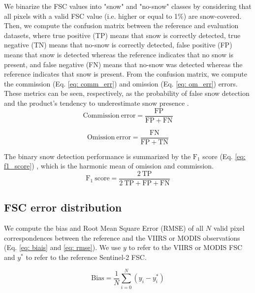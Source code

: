 \documentclass[tc, manuscript]{copernicus}
\begin{document}
We binarize the FSC values into "snow" and "no-snow" classes by considering that all pixels with a valid FSC value (i.e. higher or equal to 1\%) are snow-covered. Then, we compute the confusion matrix between the reference and evaluation datasets, where true positive (TP) means that snow is correctly detected, true negative (TN) means that no-snow is correctly detected, false positive (FP) means that snow is detected whereas the reference indicates that no snow is present, and false negative (FN) means that no-snow was detected whereas the reference indicates that snow is present. From the confusion matrix, we compute the commission (Eq. \ref{eq: comm_err}) and omission (Eq. \ref{eq: om_err}) errors. These metrics can be seen, respectively, as the probability of false snow detection and the product's tendency to underestimate snow presence \citep{schwaizer2020SnowCoverExtentb}.
\begin{equation}
    \mathrm{Commission ~ error} = \frac{\mathrm{FP}}{\mathrm{FP}+\mathrm{FN}}
\label{eq: comm_err}
\end{equation}


\begin{equation}
    \mathrm{Omission ~ error} = \frac{\mathrm{FN}}{\mathrm{FP}+\mathrm{TN}}
\label{eq: om_err}
\end{equation}

The binary snow detection performance is summarized by the $\mathrm{F_1}$ score (Eq. \ref{eq: f1_score}) \citep{rittger_evaluation_2021, zhang_comparative_2020}, which is the harmonic mean of omission and commission.
\begin{equation}
    \mathrm{F_1 ~ score} = \frac{2~\mathrm{TP}}{2~\mathrm{TP}+\mathrm{FP}+\mathrm{FN}}
\label{eq: f1_score}
\end{equation}





\subsection{FSC error distribution}
\label{subsec: methods_distribution}

We compute the bias and Root Mean Square Error (RMSE) of all $ N $ valid pixel correspondences between the reference and the VIIRS or MODIS observations (Eq. \ref{eq: biais} and \ref{eq: rmse}). We use $y$ to refer to the VIIRS or MODIS FSC and $y^*$ to refer to the reference Sentinel-2 FSC.


\begin{equation}
 \mathrm{Bias} = \frac{1}{N} \sum_{i=0}^{N} (y_i - y^*_i)
\label{eq: biais}
\end{equation}
\end{document}
